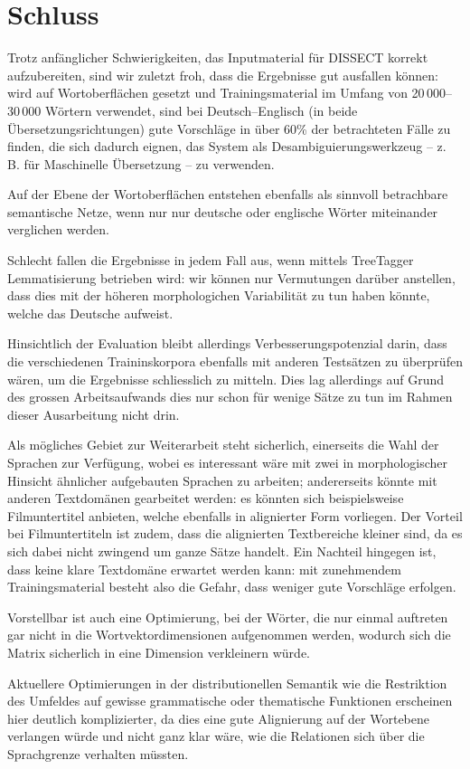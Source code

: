 \documentclass[11pt,twoside,openright]{mpreport}
\begin{document}
\chapter{Schluss}
\label{cha:schluss}
Trotz anfänglicher Schwierigkeiten, das Inputmaterial für DISSECT korrekt aufzubereiten, sind wir zuletzt froh, dass die Ergebnisse
gut ausfallen können: wird auf Wortoberflächen gesetzt und Trainingsmaterial im Umfang von 20\,000--30\,000 Wörtern verwendet, sind bei
Deutsch--Englisch (in beide Übersetzungsrichtungen) gute Vorschläge in über 60\% der betrachteten Fälle zu finden, die sich dadurch eignen,
das System als Desambiguierungswerkzeug -- z. B. für Maschinelle Übersetzung -- zu verwenden.

Auf der Ebene der Wortoberflächen entstehen ebenfalls als sinnvoll betrachbare semantische Netze, wenn nur nur deutsche oder englische
Wörter miteinander verglichen werden.

Schlecht fallen die Ergebnisse in jedem Fall aus, wenn mittels TreeTagger Lemmatisierung betrieben wird: wir können nur Vermutungen darüber
anstellen, dass dies mit der höheren morphologichen Variabilität zu tun haben könnte, welche das Deutsche aufweist. 

Hinsichtlich der Evaluation bleibt allerdings Verbesserungspotenzial darin, dass die verschiedenen Traininskorpora ebenfalls mit anderen
Testsätzen zu überprüfen wären, um die Ergebnisse schliesslich zu mitteln. Dies lag allerdings auf Grund des grossen Arbeitsaufwands dies nur schon für
 wenige Sätze zu tun im Rahmen dieser Ausarbeitung nicht drin.

Als mögliches Gebiet zur Weiterarbeit steht sicherlich, einerseits die Wahl der Sprachen zur Verfügung, wobei es interessant wäre mit zwei in morphologischer
Hinsicht ähnlicher aufgebauten Sprachen zu arbeiten; andererseits könnte mit anderen Textdomänen gearbeitet werden: es könnten sich beispielsweise
Filmuntertitel anbieten, welche ebenfalls in alignierter Form vorliegen. Der Vorteil bei Filmuntertiteln ist zudem, dass die alignierten Textbereiche
kleiner sind, da es sich dabei nicht zwingend um ganze Sätze handelt. Ein Nachteil hingegen ist, dass keine klare Textdomäne erwartet werden kann:
mit zunehmendem Trainingsmaterial besteht also die Gefahr, dass weniger gute Vorschläge erfolgen.

Vorstellbar ist auch eine Optimierung, bei der Wörter, die nur einmal auftreten gar nicht in die Wortvektordimensionen aufgenommen werden, wodurch sich die Matrix sicherlich in eine Dimension verkleinern würde.

Aktuellere Optimierungen in der distributionellen Semantik wie die Restriktion des Umfeldes auf gewisse grammatische oder thematische Funktionen erscheinen hier deutlich komplizierter, da dies eine gute Alignierung auf der Wortebene verlangen würde und nicht ganz klar wäre, wie die Relationen sich über die Sprachgrenze verhalten müssten.

\end{document}
